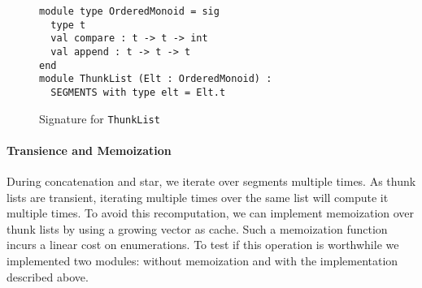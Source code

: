 
\begin{figure}[tp]
  \centering
\begin{lstlisting}
module type OrderedMonoid = sig
  type t
  val compare : t -> t -> int
  val append : t -> t -> t
end
module ThunkList (Elt : OrderedMonoid) :
  SEGMENTS with type elt = Elt.t
\end{lstlisting}
  \vspace{-\baselineskip}
  \caption{Signature for \texttt{ThunkList}}
  \label{code:thunklist}
\end{figure}

\paragraph{Transience and Memoization}

During concatenation and star, we iterate over segments multiple times.
As thunk lists are transient, iterating multiple times over the same list
will compute it multiple times. To avoid this recomputation, we can implement memoization
over thunk lists by using a growing vector as cache.
%
Such a memoization function incurs a linear cost on enumerations. To test
if this operation is worthwhile we implemented two modules:
 without memoization and 
with the implementation described above.

